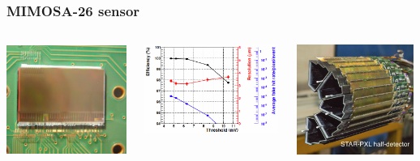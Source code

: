 \documentclass{beamer}
\begin{document}
\begin{frame}
  \frametitle{MIMOSA-26 sensor}

  \vspace{-0.5cm}
  \begin{columns}[c]
    \begin{column}{4cm}
      \begin{center}
        \includegraphics[width = 4.0cm,height=3.6cm]{Pictures/mi26.jpg}
      \end{center}
    \end{column}

    \begin{column}{4cm}
      \vspace{-0.3cm}
      \begin{center}
        \includegraphics[width = 4.5cm]{Pictures/MIMOSA26_chip26_HR15_20deg.png}

      \end{center}
    \end{column}
    \begin{column}{4cm}
      \begin{center}
        \includegraphics[width = 4.0cm, height=3.6cm]{Pictures/pxlFinal_sideView_smallSize.jpg}
      \end{center}
    \end{column}
  \end{columns}


\end{frame}
\end{document}
